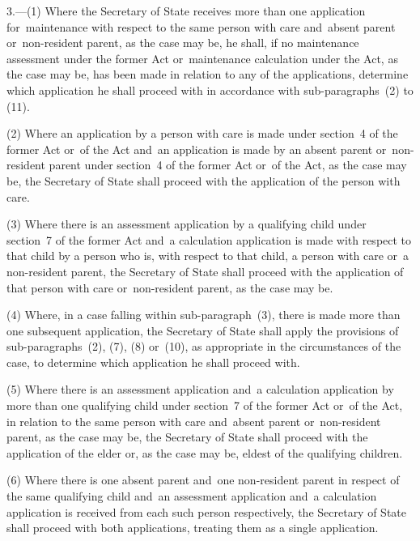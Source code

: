 \documentclass[12pt,a4paper]{article}
\begin{document}
3.---(1)  Where the Secretary of State receives more than one application for~maintenance with respect to the same person with care and~absent parent or~non-resident parent, as the case may be, he shall, if no maintenance assessment under the former Act or~maintenance calculation under the Act, as the case may be, has been made in relation to any of the applications, determine which application he shall proceed with in accordance with sub-paragraphs~(2) to (11).

(2) Where an application by a person with care is made under section~4 of the former Act or~of the Act
and~an application is made by an absent parent or~non-resident parent under section~4 of the former Act or~of the Act, as the case may be, the Secretary of State shall proceed with the application of the person with care.

(3) Where there is an assessment application by a qualifying child under section~7 of the former Act and~a calculation application is made with respect to that child by a person who is, with respect to that child, a person with care or~a non-resident parent, the Secretary of State shall proceed with the application of that person with care or~non-resident parent, as the case may be.

(4) Where, in a case falling within sub-paragraph~(3), there is made more than one subsequent application, the Secretary of State shall apply the provisions of sub-paragraphs~(2), (7), (8) or~(10), as appropriate in the circumstances of the case, to determine which application he shall proceed with.

(5) Where there is an assessment application and~a calculation application by more than one qualifying child under section~7 of the former Act or~of the Act, in relation to the same person with care and~absent parent or~non-resident parent, as the case may be, the Secretary of State shall proceed with the application of the elder or, as the case may be, eldest of the qualifying children.

(6) Where there is one absent parent and~one non-resident parent in respect of the same qualifying child and~an assessment application and~a calculation application is received from each such person respectively, the Secretary of State shall proceed with both applications, treating them as a single application.

\end{document}
